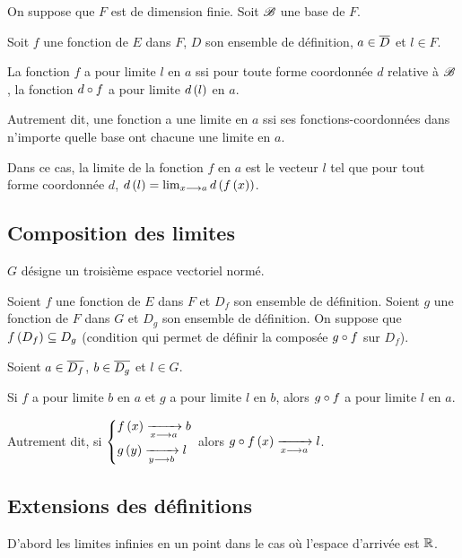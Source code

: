 \begin{theo}
On suppose que \(F\) est de dimension finie. Soit \(\mathscr{B}\) une base de \(F\).

Soit \(f\) une fonction de \(E\) dans \(F\), \(D\) son ensemble de définition, \(a\in\overline{D}\) et \(l\in F\).

La fonction \(f\) a pour limite \(l\) en \(a\) ssi pour toute forme coordonnée \(d\) relative à \(\mathscr{B}\), la fonction \(d\circ f\) a pour limite \(d\left(l\right)\) en \(a\).

Autrement dit, une fonction a une limite en \(a\) ssi ses fonctions-coordonnées dans n'importe quelle base ont chacune une limite en \(a\).

Dans ce cas, la limite de la fonction \(f\) en \(a\) est le vecteur \(l\) tel que pour tout forme coordonnée \(d\), \(d\left(l\right)=\lim_{x\longrightarrow a}d\left(f\left(x\right)\right)\).
\end{theo}

\subsection{Composition des limites}

\(G\) désigne un troisième espace vectoriel normé.

\begin{theo}
Soient \(f\) une fonction de \(E\) dans \(F\) et \(D_f\) son ensemble de définition. Soient \(g\) une fonction de \(F\) dans \(G\) et \(D_g\) son ensemble de définition. On suppose que \(f\left(D_f\right)\subseteq D_g\) (condition qui permet de définir la composée \(g\circ f\) sur \(D_f\)).

Soient \(a\in\overline{D_f}\), \(b\in\overline{D_g}\) et \(l\in G\).

Si \(f\) a pour limite \(b\) en \(a\) et \(g\) a pour limite \(l\) en \(b\), alors \(g\circ f\) a pour limite \(l\) en \(a\).

Autrement dit, si \(\begin{dcases}
f\left(x\right)\xrightarrow[x\longrightarrow a]{}b \\
g\left(y\right)\xrightarrow[y\longrightarrow b]{}l
\end{dcases}\) alors \(g\circ f\left(x\right)\xrightarrow[x\longrightarrow a]{}l\).
\end{theo}

\subsection{Extensions des définitions}

D'abord les limites infinies en un point dans le cas où l'espace d'arrivée est \(\mathbb{R}\).

